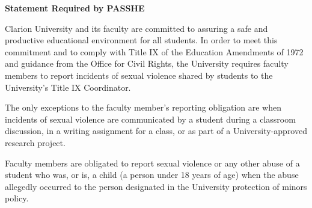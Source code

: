 \documentclass{article}
\begin{document}
\clearpage

\begin{center}
{\bf Statement Required by PASSHE}  
\end{center}

Clarion University and its faculty are committed to assuring a safe and productive educational environment for all students. In order to meet this commitment and to comply with Title IX of the Education Amendments of 1972 and guidance from  the Office for Civil Rights, the University requires faculty members to report incidents of sexual violence shared by students to the University's Title IX Coordinator.                         

The only exceptions to the faculty member's reporting obligation are when incidents of sexual violence are communicated by a student during a classroom discussion, in a writing assignment for a class, or as part of a University-approved research project.                           

Faculty members are obligated to report sexual violence or any other abuse of a student who was, or is, a child (a person under 18 years of age) when the abuse allegedly occurred to the person designated in the University protection of minors policy. 
\end{document}
